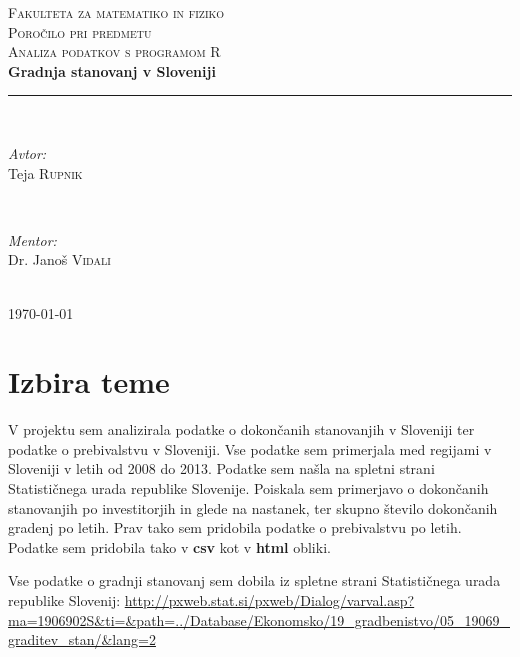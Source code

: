 \documentclass[11pt,a4paper]{article}
\begin{document}
\begin{titlepage}
\newcommand{\HRule}{\rule{\linewidth}{0.5mm}}
\center

\textsc{\LARGE Fakulteta za matematiko in fiziko}\\[3 cm]
\textsc{\Large Poročilo pri predmetu}\\[0.5cm]
\textsc{\large Analiza podatkov s programom R}\\[2 cm]
{ \huge \bfseries Gradnja stanovanj v Sloveniji}\\[0.4cm]
\HRule \\[9 cm]


\begin{minipage}{0.4\textwidth}
\begin{flushleft} \large
\emph{Avtor:}\\
Teja \textsc{Rupnik}
\end{flushleft}
\end{minipage}
~
\begin{minipage}{0.4\textwidth}
\begin{flushright} \large
\emph{Mentor:} \\
Dr. Janoš \textsc{Vidali}
\end{flushright}
\end{minipage}\\[2 cm]

{\large \today}\\[3cm] 


\end{titlepage}
\pagebreak

\newpage
\section{Izbira teme}
V projektu sem analizirala podatke o dokončanih stanovanjih v Sloveniji ter podatke o prebivalstvu v Sloveniji. Vse podatke sem primerjala med regijami v Sloveniji v letih od 2008 do 2013. Podatke sem našla na spletni strani Statističnega urada republike Slovenije. Poiskala sem primerjavo o dokončanih stanovanjih po investitorjih in glede na nastanek, ter skupno število dokončanih gradenj po letih. Prav tako sem pridobila podatke o prebivalstvu po letih. Podatke sem pridobila tako v \large\textbf{csv} kot v  \large\textbf{html} obliki.
\newline

Vse podatke o gradnji stanovanj sem dobila iz spletne strani Statističnega urada republike Slovenij:\newline
\url{http://pxweb.stat.si/pxweb/Dialog/varval.asp?ma=1906902S&ti=&path=../Database/Ekonomsko/19_gradbenistvo/05_19069_graditev_stan/&lang=2}
\newline
\end{document}
